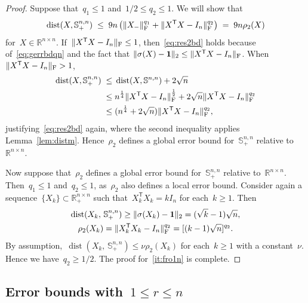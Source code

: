 \documentclass[11pt,a4paper]{article}  %
\theoremstyle{definition}
\DeclareMathOperator{\dist}{dist}
\newcommand{\RR}{\mathbb{R}}
\newcommand{\res}{\rho}
\newcommand{\col}{r}
\newcommand{\stf}[1]{\mathbb{S}^{#1}}
\newcommand{\fro}{{\scriptstyle{\textnormal{F}}}}
\newcommand{\trs}{{\scriptstyle{\mathsf{T}}}}
\newcommand{\ones}{\mathbf{1}}
\begin{document}
\begin{proof}
    Suppose that~$q_1 \le 1$ and~$1/2 \le q_2 \le 1$. We will show that
    \begin{equation}
        \label{eq:res2bd}
        \dist(X, \stf{n, n}_+)
        \;\le\; 9n\left( \|X_{-}\|_\fro^{q_1} + \|X^\trs X -I_n\|_\fro^{q_2} \right)
        \;=\; 9n\res_2(X)
    \end{equation}
    for~$X\in\RR^{n\times n}$.
    If~$\|X^\trs X - I_n\|_\fro \le 1$, then~\eqref{eq:res2bd} holds
    because of~\eqref{eq:gerrbdqn} and the fact that $\|\sigma(X) -\ones\|_2 \le \|X^\trs X - I_n\|_\fro$.
    When~$\|X^\trs X - I_n\|_\fro > 1$,
    \begin{equation}
        \nonumber
        \begin{split}
        \dist(X, \stf{n, n}_+) \;\le\; &\dist(X, \stf{n, n})  + 2\sqrt{n}  \\
        \;\le\;&  n^{\frac{1}{4}} \|X^\trs X - I_n\|_\fro^{\frac{1}{2}} + 2\sqrt{n}  \|X^\trs X - I_n\|_\fro^{q_2} \\
        \;\le\;&  (n^{\frac{1}{4}} + 2\sqrt{n})\|X^\trs X - I_n\|_\fro^{q_2},
        \end{split}
    \end{equation}
    justifying~\eqref{eq:res2bd} again, where the second inequality applies Lemma~\ref{lem:distm}.
    Hence~$\res_2$ defines a global error bound for~$\stf{n,n}_+$ relative to~$\RR^{n\times n}$.

    Now suppose that~$\res_2$ defines a global error bound for~$\stf{n,n}_+$ relative
    to~$\RR^{n\times n}$. Then~$q_1 \le 1$ and~$q_2 \le 1$, as~$\res_2$ also defines a local
    error bound.
    Consider again a sequence~$\{X_k\}\subset \RR^{n\times n}_+$ such that~$X_k^\trs X_k = kI_n$
    for each~$k\ge 1$. Then
    \begin{gather*}
        \dist(X_k,\, \stf{n,n}_+) \ge \|\sigma(X_k) -\ones\|_2 =  (\sqrt{k}-1) \sqrt{n},\\
        \res_2(X_k) = \|X_k^\trs X_k -I_n\|_\fro^{q_2} = [(k-1)\sqrt{n}]^{q_2}.
    \end{gather*}
    By assumption,~$\dist(X_k,\, \stf{n,n}_+)\le \nu \res_2(X_k)$ for each~$k\ge 1$ with a constant~$\nu$.
  {Hence we have}~$q_2 \ge 1/2$.
    The proof for~\ref{it:fro1n} is complete.
\end{proof}



\subsection{Error bounds with~$1 \le \col \le n$}
\label{ssec:errbdr}
\end{document}
